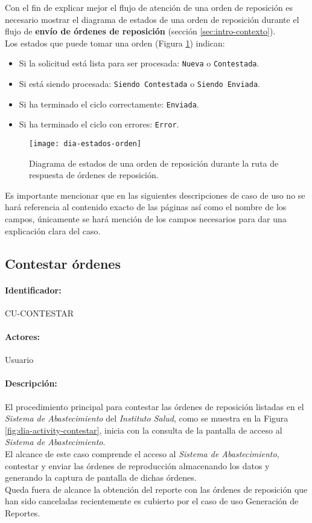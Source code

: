 Con el fin de explicar mejor el flujo de atención de una orden de reposición es necesario mostrar el diagrama de estados de una orden de reposición durante el flujo de \textbf{envío de órdenes de reposición} (sección \ref{sec:intro-contexto}).\\
Los estados que puede tomar una orden (Figura \ref{fig:dia-estados-orden}) indican:
\begin{itemize}
  \item Si la solicitud está lista para ser procesada: \texttt{Nueva} o \texttt{Contestada}.
  \item Si está siendo procesada: \texttt{Siendo Contestada} o \texttt{Siendo Enviada}.
  \item Si ha terminado el ciclo correctamente: \texttt{Enviada}.
  \item Si ha terminado el ciclo con errores: \texttt{Error}.
\end{itemize} 

\begin{figure}[h]
  \centering
  \texttt{[image: dia-estados-orden]} 
  \caption{Diagrama de estados de una orden de reposición durante la ruta de respuesta de órdenes de reposición.}
  \label{fig:dia-estados-orden}
\end{figure}

Es importante mencionar que en las siguientes descripciones de caso de uso no se hará referencia al contenido exacto de las páginas así como el nombre de los campos, únicamente se hará mención de los campos necesarios para dar una explicación clara del caso.

\subsection{Contestar órdenes}\label{cu-contestar}
\paragraph{Identificador:}
CU-CONTESTAR
\paragraph{Actores:}
Usuario
\paragraph{Descripción:}
El procedimiento principal para contestar las órdenes de reposición listadas en el \textit{Sistema de Abastecimiento} del \textit{Instituto Salud}, como se muestra en la Figura \ref{fig:dia-activity-contestar}, inicia con la consulta de la pantalla de acceso al \textit{Sistema de Abastecimiento}.\\
El alcance de este caso comprende el acceso al \textit{Sistema de Abastecimiento}, contestar y enviar las órdenes de reproducción almacenando los datos y generando la captura de pantalla de dichas órdenes.\\
Queda fuera de alcance la obtención del reporte con las órdenes de reposición que han sido canceladas recientemente es cubierto por el caso de uso Generación de Reportes.
